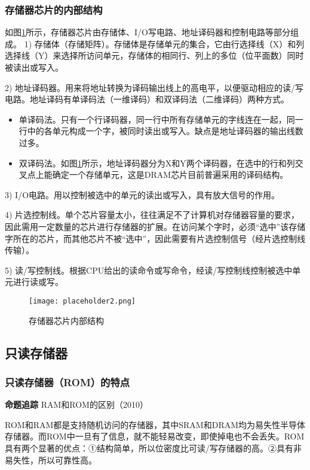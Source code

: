 \documentclass[UTF8]{ctexart}
\begin{document}
	\subsubsection{存储器芯片的内部结构}
	如图\ref{fig:memory_chip_structure}所示，存储器芯片由存储体、I/O写电路、地址译码器和控制电路等部分组成。
	1) 存储体（存储矩阵）。存储体是存储单元的集合，它由行选择线（X）和列选择线（Y）来选择所访问单元，存储体的相同行、列上的多位（位平面数）同时被读出或写入。
	
	2) 地址译码器。用来将地址转换为译码输出线上的高电平，以便驱动相应的读/写电路。地址译码有单译码法（一维译码）和双译码法（二维译码）两种方式。
	\begin{itemize}
		\item 单译码法。只有一个行译码器，同一行中所有存储单元的字线连在一起，同一行中的各单元构成一个字，被同时读出或写入。缺点是地址译码器的输出线数过多。
		\item 双译码法。如图\ref{fig:memory_chip_structure}所示，地址译码器分为X和Y两个译码器，在选中的行和列交叉点上能确定一个存储单元，这是DRAM芯片目前普遍采用的译码结构。
	\end{itemize}
	3) I/O电路。用以控制被选中的单元的读出或写入，具有放大信号的作用。
	
	4) 片选控制线。单个芯片容量太小，往往满足不了计算机对存储器容量的要求，因此需用一定数量的芯片进行存储器的扩展。在访问某个字时，必须“选中”该存储字所在的芯片，而其他芯片不被“选中”，因此需要有片选控制信号（经片选控制线传输）。
	
	5) 读/写控制线。根据CPU给出的读命令或写命令，经读/写控制线控制被选中单元进行读或写。
	
	\begin{figure}[h]
		\centering
		\caption{存储器芯片内部结构}
		\label{fig:memory_chip_structure}
		\texttt{[image: placeholder2.png]} 
	\end{figure}
	
	\subsection{只读存储器}
	\subsubsection{只读存储器（ROM）的特点}
	\begin{tcolorbox}[colframe=black, colback=white]
		\kaishu \textbf{命题追踪} \quad RAM和ROM的区别（2010）
	\end{tcolorbox}
	ROM和RAM都是支持随机访问的存储器，其中SRAM和DRAM均为易失性半导体存储器。而ROM中一旦有了信息，就不能轻易改变，即使掉电也不会丢失。ROM具有两个显著的优点：①结构简单，所以位密度比可读/写存储器的高。②具有非易失性，所以可靠性高。
	
\end{document}
